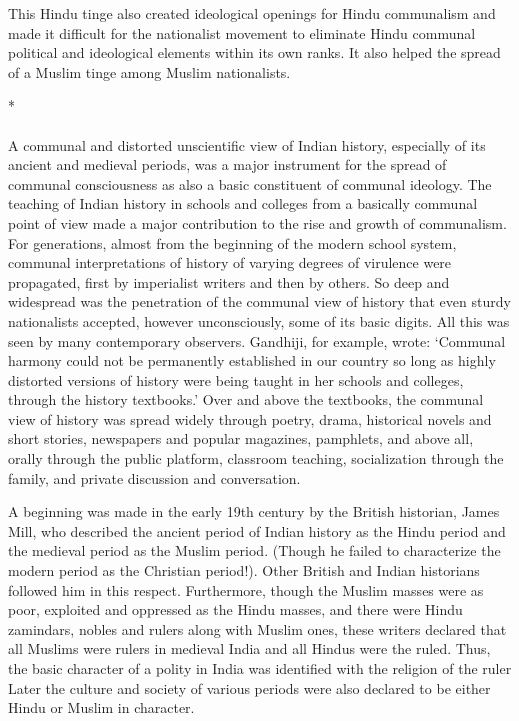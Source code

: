 This Hindu tinge also created ideological openings for Hindu communalism and made it difficult for the nationalist movement to eliminate Hindu communal political and ideological elements within its own ranks. It also helped the spread of a Muslim tinge among Muslim nationalists.

\begin{center}*\end{center}

\paragraph*{}


A communal and distorted unscientific view of Indian history, especially of its ancient and medieval periods, was a major instrument for the spread of communal consciousness as also a basic constituent of communal ideology. The teaching of Indian history in schools and colleges from a basically communal point of view made a major contribution to the rise and growth of communalism. For generations, almost from the beginning of the modern school system, communal interpretations of history of varying degrees of virulence were propagated, first by imperialist writers and then by others. So deep and widespread was the penetration of the communal view of history that even sturdy nationalists accepted, however unconsciously, some of its basic digits. All this was seen by many contemporary observers. Gandhiji, for example, wrote: `Communal harmony could not be permanently established in our country so long as highly distorted versions of history were being taught in her schools and colleges, through the history textbooks.' Over and above the textbooks, the communal view of history was spread widely through poetry, drama, historical novels and short stories, newspapers and popular magazines, pamphlets, and above all, orally through the public platform, classroom teaching, socialization through the family, and private discussion and conversation. 

A beginning was made in the early 19th century by the British historian, James Mill, who described the ancient period of Indian history as the Hindu period and the medieval period as the Muslim period. (Though he failed to characterize the modern period as the Christian period!). Other British and Indian historians followed him in this respect. Furthermore, though the Muslim masses were as poor, exploited and oppressed as the Hindu masses, and there were Hindu zamindars, nobles and rulers along with Muslim ones, these writers declared that all Muslims were rulers in medieval India and all Hindus were the ruled. Thus, the basic character of a polity in India was identified with the religion of the ruler Later the culture and society of various periods were also declared to be either Hindu or Muslim in character. 

